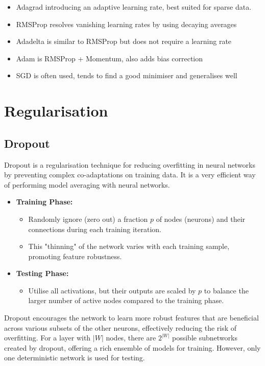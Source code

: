 \begin{itemize}
    \item Adagrad introducing an adaptive learning rate, best suited for sparse data.
    \item RMSProp resolves vanishing learning rates by using decaying averages
    \item Adadelta is similar to RMSProp but does not require a learning rate
    \item Adam is RMSProp + Momentum, also adds bias correction
    \item SGD is often used, tends to find a good minimiser and generalises well
\end{itemize}

\section{Regularisation}
\subsection{Dropout}
Dropout is a regularisation technique for reducing overfitting in neural networks by preventing complex co-adaptations on training data. It is a very efficient way of performing model averaging with neural networks.

\begin{itemize}
    \item \textbf{Training Phase:}
    \begin{itemize}
        \item Randomly ignore (zero out) a fraction \( p \) of nodes (neurons) and their connections during each training iteration.
        \item This "thinning" of the network varies with each training sample, promoting feature robustness.
    \end{itemize}
    \item \textbf{Testing Phase:}
    \begin{itemize}
        \item Utilise all activations, but their outputs are scaled by \( p \) to balance the larger number of active nodes compared to the training phase.
    \end{itemize}
\end{itemize}

Dropout encourages the network to learn more robust features that are beneficial across various subsets of the other neurons, effectively reducing the risk of overfitting. For a layer with \( |W| \) nodes, there are \( 2^{|W|} \) possible subnetworks created by dropout, offering a rich ensemble of models for training. However, only one deterministic network is used for testing.

